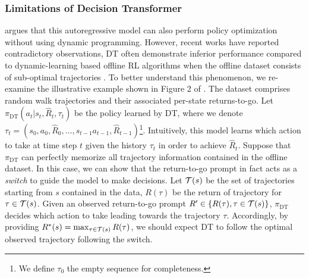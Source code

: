 \iffalse
\subsubsection{Limitations of Decision Transformer}
\label{sec:dt-limitations}

\citet{chen2021decision} argues that this autoregressive model can also perform policy optimization without using dynamic programming. 
However, recent works have reported contradictory observations, 
DT often demonstrate inferior performance compared to dynamic-learning based offline RL algorithms when the offline dataset consists of sub-optimal trajectories \citep{fujimoto2021minimalist,emmons2021rvs,kostrikov2022offline}. 
To better understand this phenomenon, we re-examine the illustrative example shown in  Figure 2 of \citet{chen2021decision}. 
The dataset comprises random walk trajectories and their associated per-state returns-to-go.  
Let $\pi_{ \mathrm{DT}}(a_t|s_t, \widehat{R}_t, \tau_t)$ be the policy learned by DT, where we denote $\tau_{t}=(s_0, a_0, \widehat{R}_0, \dots, s_{t-1} a_{t-1}, \widehat{R}_{t-1})$\footnote{We define $\tau_0$ the empty sequence for completeness. }. 
Intuitively, this model learns which action to take at time step $t$ given the history $\tau_t$ in order to achieve ${\widehat{R}_t}$.  
Suppose that $\pi_{\mathrm{DT}}$ can perfectly memorize all trajectory information contained in the offline dataset.   
In this case, 
we can show that the return-to-go prompt in fact acts as a \emph{switch} to guide the model to make decisions.  
Let ${\mathcal{T}}(s)$ be the set of trajectories starting from $s$ contained in the data, $R(\tau)$ be the return of  trajectory for $\tau\in{\mathcal{T}}(s)$.  
Given an observed return-to-go prompt $R'\in\{ R(\tau), \tau\in{\mathcal{T}}(s) \}$, $\pi_{\mathrm{DT}}$ decides which action to take leading towards the trajectory $\tau$. 
Accordingly, by providing $R^*(s)=\max_{\tau\in{\mathcal{T}}(s)} R(\tau)$, we should expect DT to follow the optimal observed trajectory following the switch. 

